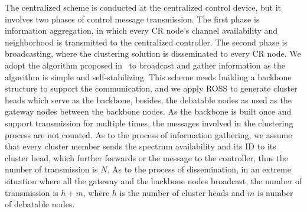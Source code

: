 \documentclass[10pt,journal,compsoc]{IEEEtran}
\theoremstyle{mytheoremstyle}
\theoremstyle{mytheoremstyle}
\theoremstyle{mytheoremstyle}
\begin{document}
The centralized scheme is conducted at the centralized control device, but it involves two phases of control message transmission.
The first phase is information aggregation, in which every CR node's channel availability and neighborhood is transmitted to the centralized controller.
The second phase is broadcasting, where the clustering solution is disseminated to every CR node.
%
We adopt the algorithm proposed in~\cite{Efficient_broadcasting_gathering_adhoc} to broadcast and gather information as the algorithm is simple and self-stabilizing.
This scheme needs building a backbone structure to support the communication, and we apply ROSS to generate cluster heads which serve as the backbone, besides, the debatable nodes as used as the gateway nodes between the backbone nodes.
As the backbone is built once and support transmission for multiple times, the messages involved in the clustering process are not counted.
As to the process of information gathering, we assume that every cluster member sends the spectrum availability and its ID to its cluster head, which further forwards or the message to the controller, thus the number of transmission is $N$.
As to the process of dissemination, in an extreme situation where all the gateway and the backbone nodes broadcast, the number of transmission is $h + m$, where $h$ is the number of cluster heads and $m$ is number of debatable nodes.
\end{document}
